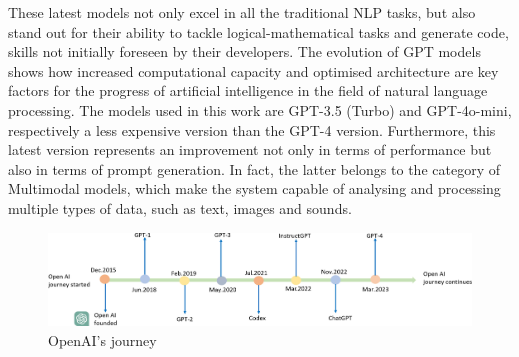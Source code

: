 These latest models not only excel in all the traditional NLP tasks, but also stand out for their ability to tackle logical-mathematical tasks and generate code, skills not initially foreseen by their developers\cite{kalyan2023surveygpt3familylarge}.
The evolution of GPT models shows how increased computational capacity and optimised architecture are key factors for the progress of artificial intelligence in the field of natural language processing. The models used in this work are GPT-3.5 (Turbo) and GPT-4o-mini, respectively a less expensive version than the GPT-4 version.
Furthermore, this latest version represents an improvement not only in terms of performance but also in terms of prompt generation. In fact, the latter belongs to the category of Multimodal models, which make the system capable of analysing and processing multiple types of data, such as text, images and sounds.
\begin{figure}[h]
    \centering
    \includegraphics[width=0.7\linewidth]{Figures/Gpt.jpg}
    \caption{OpenAI's journey \cite{Journey}}
    \label{fig:graph}
\end{figure}

